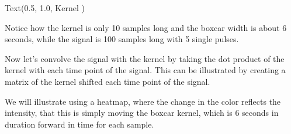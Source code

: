 \documentclass[letterpaper,10pt,english]{sphinxmanual}
\begin{document}
\begin{sphinxVerbatim}[commandchars=\\\{\}]
Text(0.5, 1.0, \PYGZsq{}Kernel \PYGZsq{})
\end{sphinxVerbatim}

\noindent{}

Notice how the kernel is only 10 samples long and the boxcar width is about 6 seconds, while the signal is 100 samples long with 5 single pulses.

Now let’s convolve the signal with the kernel by taking the dot product of the kernel with each time point of the signal. This can be illustrated by creating a matrix of the kernel shifted each time point of the signal.

We will illustrate using a heatmap, where the change in the color reflects the intensity, that this is simply moving the boxcar kernel, which is 6 seconds in duration forward in time for each sample.

\begin{sphinxVerbatim}[commandchars=\\\{\}]
     
   
    \PYG{p}{[} \PYG{p}{]}  

 
 
 
 
 
\end{sphinxVerbatim}
\end{document}
